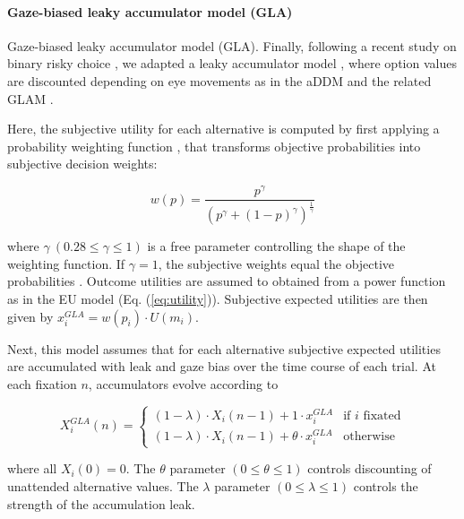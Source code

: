 \documentclass[11pt, a4paper]{article}
\begin{document}
\paragraph{Gaze-biased leaky accumulator model (GLA)}

Gaze-biased leaky accumulator model (GLA). Finally, following a recent study on binary risky choice \autocite{glickman2019FormationPreferenceRisky}, we adapted a leaky accumulator model \autocite{usher2001TimeCoursePerceptual}, where option values are discounted depending on eye movements as in the aDDM \autocite{krajbich2010VisualFixationsComputation,krajbich2011MultialternativeDriftdiffusionModel} and the related GLAM \autocite{molter2019GLAMboxPythonToolbox,thomas2019GazeBiasDifferences}.

Here, the subjective utility for each alternative is computed by first applying a probability weighting function \autocite{tversky1992AdvancesProspectTheory}, that transforms objective probabilities into subjective decision weights:

\begin{equation}
    \label{eq:pweighting}
    w(p) = \frac{p^\gamma}{(p^\gamma + (1 - p)^\gamma)^{\frac{1}{\gamma}}}
\end{equation}

where $\gamma~(0.28 \le \gamma \le 1)$ is a free parameter controlling the shape of the weighting function. If $\gamma = 1$, the subjective weights equal the objective probabilities \autocite{cavagnaro2013DiscriminatingProbabilityWeighting}. Outcome utilities are assumed to obtained from a power function as in the EU model (Eq. (\ref{eq:utility})). Subjective expected utilities are then given by $x_i^{GLA} = w(p_i) \cdot U(m_i)$.

Next, this model assumes that for each alternative subjective expected utilities are accumulated with leak and gaze bias over the time course of each trial. At each fixation $n$, accumulators evolve according to

\begin{equation}
    X_i^{GLA}(n) = \begin{cases}
             (1 - \lambda) \cdot X_i(n - 1) + 1 \cdot x_i^{GLA} &\text{if $i$ fixated}\\
             (1 - \lambda) \cdot X_i(n - 1) + \theta \cdot x_i^{GLA} &\text{otherwise}
             \end{cases}
\end{equation}

where all $X_i(0) = 0$. The $\theta$ parameter $(0 \le \theta \le 1)$ controls discounting of unattended alternative values. The $\lambda$ parameter $(0 \le \lambda \le 1)$ controls the strength of the accumulation leak.
\end{document}
